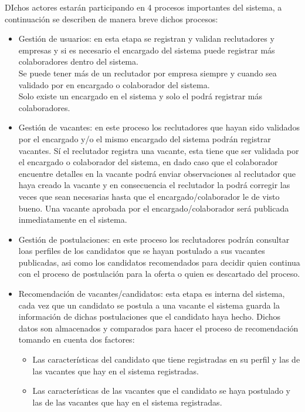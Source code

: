 DIchos actores estarán participando en 4 procesos importantes del sistema, a continuación se describen de manera breve dichos procesos:
\begin{itemize}
    \item Gestión de usuarios: en esta etapa se registran y validan reclutadores y empresas y si es necesario el encargado del sistema puede registrar más colaboradores dentro del sistema.\\Se puede tener más de un reclutador por empresa siempre y cuando sea validado por en encargado o colaborador del sistema.\\Solo existe un encargado en el sistema y solo el podrá registrar más colaboradores.
    \item Gestión de vacantes: en este proceso los reclutadores que hayan sido validados por el encargado y/o el mismo encargado del sistema podrán registrar vacantes. Sí el reclutador registra una vacante, esta tiene que ser validada por el encargado o colaborador del sistema, en dado caso que el colaborador encuentre detalles en la vacante podrá enviar observaciones al reclutador que haya creado la vacante y en consecuencia el reclutador la podrá corregir las veces que sean necesarias hasta que el encargado/colaborador le de visto bueno. Una vacante aprobada por el encargado/colaborador será publicada inmediatamente en el sistema. 
    \item Gestión de postulaciones: en este proceso los reclutadores podrán consultar loas perfiles de los candidatos que se hayan postulado a sus vacantes publicadas, asi como los candidatos recomendados para decidir quien continua con el proceso de postulación para la oferta o quien es descartado del proceso.%
    \item Recomendación de vacantes/candidatos: esta etapa es interna del sistema, cada vez que un candidato se postula a una vacante el sistema guarda la información de dichas postulaciones que el candidato haya hecho. Dichos datos son almacenados y comparados para hacer el proceso de recomendación tomando en cuenta dos factores:
    \begin{itemize}
        \item Las características del candidato que tiene registradas en su perfil y las de las vacantes que hay en el sistema registradas.
        \item Las características de las vacantes que el candidato se haya postulado y las de las vacantes que hay en el sistema registradas.
    \end{itemize} 
\end{itemize} 